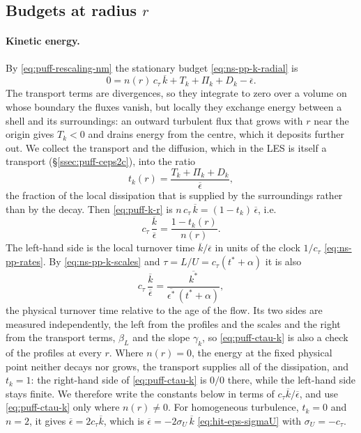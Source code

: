\documentclass{article}
\begin{document}
\subsection{Budgets at radius \texorpdfstring{$r$}{r}}\label{ssec:puff-budgets}
\paragraph{Kinetic energy.}
By \eqref{eq:puff-rescaling-nm} the stationary budget
\eqref{eq:ns-pp-k-radial} is
\begin{equation}\label{eq:puff-k-r}
  0 = n(r)\, c_\tau\, \overline{k} + T_k + \Pi_k + D_k - \overline{\epsilon} .
\end{equation}
The transport terms are divergences, so they integrate to zero over a volume
on whose boundary the fluxes vanish, but locally they exchange energy between
a shell and its surroundings: an outward turbulent flux that grows with $r$
near the origin gives $T_k < 0$ and drains energy from the centre, which it
deposits further out. We collect the transport and the diffusion, which in
the LES is itself a transport (\S\ref{ssec:puff-ceps2c}), into the ratio
\begin{equation}\label{eq:puff-tk}
  t_k(r) = \frac{T_k + \Pi_k + D_k}{\overline{\epsilon}} ,
\end{equation}
the fraction of the local dissipation that is supplied by the surroundings
rather than by the decay. Then \eqref{eq:puff-k-r} is
$n\, c_\tau\, \overline{k} = (1 - t_k)\, \overline{\epsilon}$, i.e.\
\begin{equation}\label{eq:puff-ctau-k}
  c_\tau\, \frac{\overline{k}}{\overline{\epsilon}} = \frac{1 - t_k(r)}{n(r)} .
\end{equation}
The left-hand side is the local turnover time $\overline{k}/\overline{\epsilon}$
in units of the clock $1/c_\tau$ \eqref{eq:ns-pp-rates}. By
\eqref{eq:ns-pp-k-scales} and $\tau = L/U = c_\tau (t^* + \alpha)$ it is also
\begin{equation*}
  c_\tau\, \frac{\overline{k}}{\overline{\epsilon}}
  = \frac{\overline{k^*}}{\overline{\epsilon^*}\, (t^* + \alpha)} ,
\end{equation*}
the physical turnover time relative to the age of the flow. Its two sides are
measured independently, the left from the profiles and the scales and the
right from the transport terms, $\beta_L$ and the slope $\gamma_k$, so
\eqref{eq:puff-ctau-k} is also a check of the profiles at every $r$. Where
$n(r) = 0$, the energy at the fixed physical point neither decays nor grows,
the transport supplies all of the dissipation, and $t_k = 1$: the right-hand
side of \eqref{eq:puff-ctau-k} is $0/0$ there, while the left-hand side stays
finite. We therefore write the constants below in terms of
$c_\tau \overline{k}/\overline{\epsilon}$, and use \eqref{eq:puff-ctau-k}
only where $n(r) \neq 0$. For homogeneous turbulence, $t_k = 0$ and $n = 2$,
it gives $\overline{\epsilon} = 2 c_\tau \overline{k}$, which is
$\overline{\epsilon} = -2\sigma_U\, \overline{k}$ \eqref{eq:hit-eps-sigmaU}
with $\sigma_U = -c_\tau$.
\end{document}
